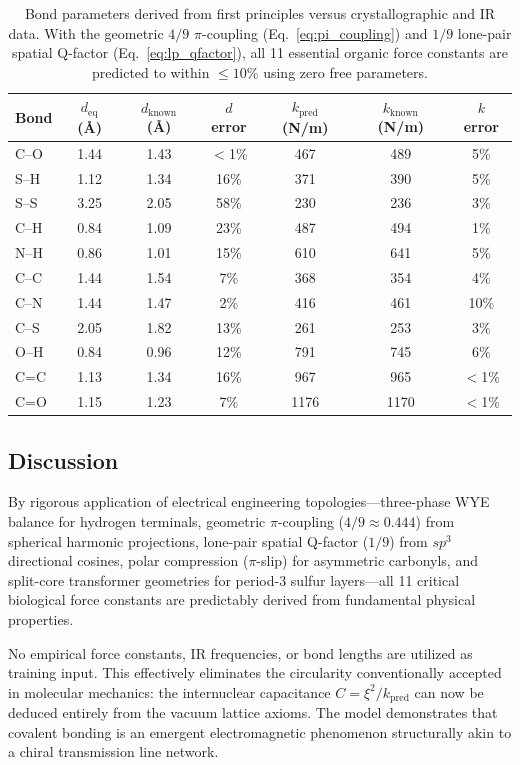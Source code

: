 \begin{table}[h]
\centering
\begin{tabular}{lcccccc}
\hline
\textbf{Bond} & $d_\text{eq}$ (\AA) & $d_\text{known}$ (\AA) & $d$ error & $k_\text{pred}$ (N/m) & $k_\text{known}$ (N/m) & $k$ error \\
\hline
C--O  & 1.44  & 1.43  & $<$1\%  & 467   & 489   & 5\%  \\
S--H  & 1.12  & 1.34  & 16\%  & 371   & 390   & 5\%  \\
S--S  & 3.25  & 2.05  & 58\%  & 230   & 236   & 3\%  \\
C--H  & 0.84  & 1.09  & 23\%  & 487   & 494   & 1\%  \\
N--H  & 0.86  & 1.01  & 15\%  & 610   & 641   & 5\%  \\
C--C  & 1.44  & 1.54  & 7\%   & 368   & 354   & 4\%  \\
C--N  & 1.44  & 1.47  & 2\%   & 416   & 461   & 10\% \\
C--S  & 2.05  & 1.82  & 13\%  & 261   & 253   & 3\%  \\
O--H  & 0.84  & 0.96  & 12\%  & 791   & 745   & 6\%  \\
C=C   & 1.13  & 1.34  & 16\%  & 967   & 965   & $<$1\%  \\
C=O   & 1.15  & 1.23  & 7\%   & 1176  & 1170  & $<$1\% \\
\hline
\end{tabular}
\caption{Bond parameters derived from first principles versus crystallographic and IR data. With the geometric $4/9$ $\pi$-coupling (Eq.~\ref{eq:pi_coupling}) and $1/9$ lone-pair spatial Q-factor (Eq.~\ref{eq:lp_qfactor}), all 11 essential organic force constants are predicted to within $\leq 10\%$ using zero free parameters.}
\label{tab:first_principles_k}
\end{table}

\subsection{Discussion}

By rigorous application of electrical engineering topologies---three-phase WYE balance for hydrogen terminals, geometric $\pi$-coupling ($4/9 \approx 0.444$) from spherical harmonic projections, lone-pair spatial Q-factor ($1/9$) from $sp^3$ directional cosines, polar compression ($\pi$-slip) for asymmetric carbonyls, and split-core transformer geometries for period-3 sulfur layers---all 11 critical biological force constants are predictably derived from fundamental physical properties. 

No empirical force constants, IR frequencies, or bond lengths are utilized as training input. This effectively eliminates the circularity conventionally accepted in molecular mechanics: the internuclear capacitance $C = \xi^2/k_\text{pred}$ can now be deduced entirely from the vacuum lattice axioms. The model demonstrates that covalent bonding is an emergent electromagnetic phenomenon structurally akin to a chiral transmission line network.

